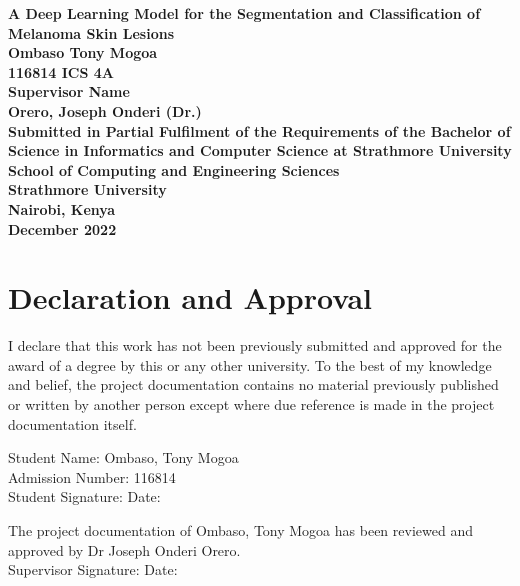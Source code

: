 \documentclass[12pt, a4paper]{article}
\begin{document}
\begin{center}
    \textbf{
        A Deep Learning Model for the Segmentation and Classification of Melanoma Skin Lesions\\
        \vspace{70pt}
        Ombaso Tony Mogoa\\
        116814
        ICS 4A\\
        \vspace{70pt}
        Supervisor Name\\
        Orero, Joseph Onderi (Dr.)\\
        \vspace{70pt}
        Submitted in Partial Fulfilment of the Requirements of the Bachelor of Science in Informatics and Computer Science at Strathmore University\\
        \vspace{70pt}
        School of Computing and Engineering Sciences\\
        Strathmore University\\
        Nairobi, Kenya\\
        \vspace{50pt}
        December 2022
    }
\end{center}

\thispagestyle{empty}
\clearpage
{}
\section*{Declaration and Approval}
I declare that this work has not been previously submitted and approved for the award of a degree by this or any other university. To the best of my knowledge and belief, the project documentation contains no material previously published or written by another person except where due reference is made in the project documentation itself.

\vspace{3cm}
Student Name: Ombaso, Tony Mogoa\\
Admission Number: 116814\\
Student Signature: \underline{\hspace{5cm}} Date: \underline{\hspace{5cm}}

\vspace{3cm}
The project documentation of Ombaso, Tony Mogoa has been reviewed and approved by Dr Joseph Onderi Orero.\\
Supervisor Signature: \underline{\hspace{5cm}} Date: \underline{\hspace{5cm}}
\clearpage
\end{document}
